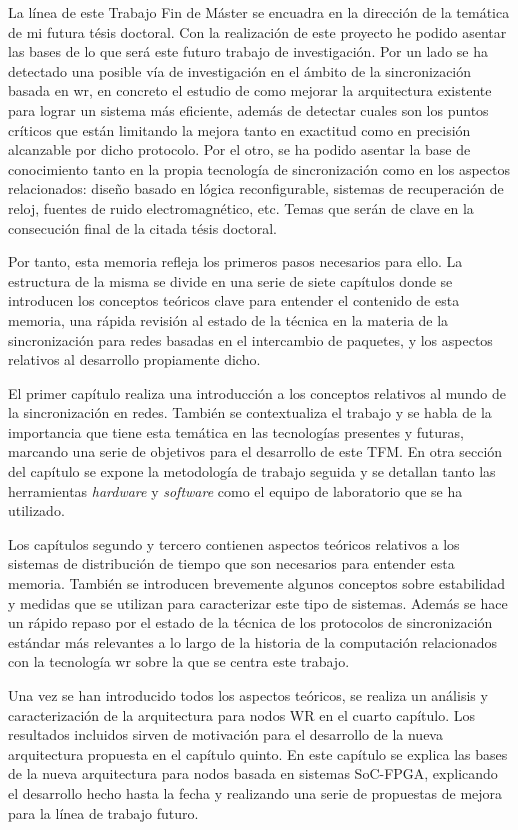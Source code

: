 La línea de este Trabajo Fin de Máster se encuadra en la dirección de la 
temática de mi futura tésis doctoral. Con la realización de este proyecto he 
podido asentar las bases de lo que será este futuro trabajo de investigación. 
Por un lado se ha detectado una posible vía de investigación en el ámbito de la 
sincronización basada en \gls{wr}, en concreto el estudio de como mejorar la 
arquitectura existente para lograr un sistema más eficiente, además de detectar 
cuales son los puntos críticos que están limitando la mejora tanto en exactitud 
como en precisión alcanzable por dicho protocolo. Por el otro, se ha podido 
asentar la base de conocimiento tanto en la propia tecnología de sincronización 
como en los aspectos relacionados: diseño basado en lógica reconfigurable, 
sistemas de recuperación de reloj, fuentes de ruido electromagnético, etc. 
Temas que serán de clave en la consecución final de la citada tésis doctoral.

Por tanto, esta memoria refleja los primeros pasos necesarios para ello. La 
estructura de la misma se divide en una serie de siete capítulos donde se 
introducen los conceptos teóricos clave para entender el contenido de esta 
memoria, una rápida revisión al estado de la técnica en la materia de la 
sincronización para redes basadas en el intercambio de paquetes, y los aspectos 
relativos al desarrollo propiamente dicho.

El primer capítulo realiza una introducción a los conceptos relativos al mundo 
de la sincronización en redes. También se contextualiza el trabajo y se habla 
de la importancia que tiene esta temática en las tecnologías presentes y 
futuras, marcando una serie de objetivos para el desarrollo de este TFM.  En 
otra sección del capítulo se expone la metodología de trabajo seguida y se 
detallan tanto las herramientas \textit{hardware} y \textit{software} como el 
equipo de laboratorio que se ha utilizado.

Los capítulos segundo y tercero contienen aspectos teóricos relativos a los 
sistemas de distribución de tiempo que son necesarios para entender esta 
memoria. También se introducen brevemente algunos conceptos sobre estabilidad y 
medidas que se utilizan para caracterizar este tipo de sistemas. Además se hace 
un rápido repaso por el estado de la técnica de los protocolos de 
sincronización estándar más relevantes a lo largo de la historia de la 
computación relacionados con la tecnología \gls{wr} sobre la que se centra este 
trabajo.

Una vez se han introducido todos los aspectos teóricos, se realiza un análisis 
y caracterización de la arquitectura para nodos WR en el cuarto capítulo. Los 
resultados incluidos sirven de motivación para el desarrollo de la nueva 
arquitectura propuesta en el capítulo quinto. En este capítulo se explica las 
bases de la nueva arquitectura para nodos basada en sistemas SoC-FPGA, 
explicando el desarrollo hecho hasta la fecha y realizando una serie de 
propuestas de mejora para la línea de trabajo futuro.

